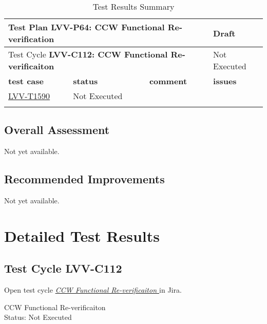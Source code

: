 \documentclass[SE,lsstdraft,STR,toc]{lsstdoc}
\begin{document}
\begin{longtable}{p{2cm}p{2.5cm}p{9cm}p{2.5cm}}
\toprule
\multicolumn{3}{l}{ Test Plan {\bf LVV-P64: CCW Functional Re-verification
 }} & Draft \\\hline

  \multicolumn{3}{l}{ Test Cycle {\bf LVV-C112: CCW Functional Re-verificaiton
 }} & Not Executed \\\hline

  {\bf \footnotesize test case} & {\bf \footnotesize status} & {\bf \footnotesize comment} & {\bf \footnotesize issues} \\\toprule

    \href{https://jira.lsstcorp.org/secure/Tests.jspa#/testCase/LVV-T1590}{LVV-T1590}
    & Not Executed &
    \begin{minipage}[]{9cm}
    \smallskip
    
    \medskip
    \end{minipage}
    &
    \\\hline
\caption{Test Results Summary}
\label{table:summary}
\end{longtable}

\subsection{Overall Assessment}
\label{sect:overallassessment}

Not yet available.

\subsection{Recommended Improvements}
\label{sect:recommendations}

Not yet available.

\newpage
\section{Detailed Test Results}
\label{sect:detailedtestresults}

\subsection{Test Cycle LVV-C112 }

Open test cycle {\it \href{https://jira.lsstcorp.org/secure/Tests.jspa#/testrun/LVV-C112}{CCW Functional Re-verificaiton
}} in Jira.

CCW Functional Re-verificaiton
\\
Status: Not Executed
\end{document}
